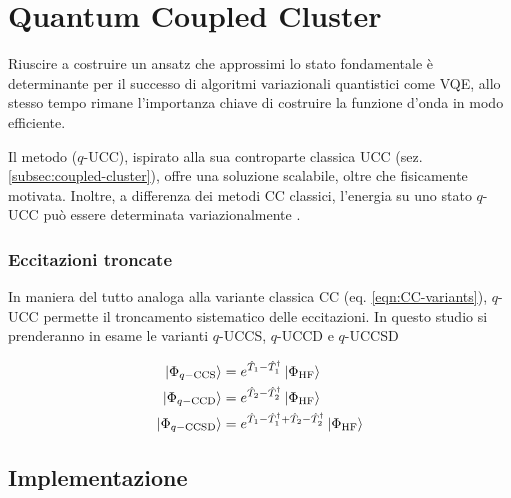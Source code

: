 \section{Quantum Coupled Cluster}\label{sez:quantum-coupled-cluster}
Riuscire a costruire un ansatz che approssimi lo stato fondamentale è determinante per il successo di algoritmi variazionali quantistici come VQE, allo stesso tempo rimane l'importanza chiave di costruire la funzione d'onda in modo efficiente.

Il metodo  ($q$-UCC), ispirato alla sua controparte classica UCC (sez. \ref{subsec:coupled-cluster}), offre una soluzione scalabile, oltre che fisicamente motivata. 
Inoltre, a differenza dei metodi CC classici, l'energia su uno stato $q$-UCC può essere determinata variazionalmente \cite{Anand_2022}.

\subsubsection{Eccitazioni troncate}

In maniera del tutto analoga alla variante classica CC (eq. \ref{eqn:CC-variants}), $q$-UCC permette il troncamento sistematico delle eccitazioni. In questo studio si prenderanno in esame le varianti $q$-UCCS, $q$-UCCD e $q$-UCCSD

\begin{subequations}\label{eqn:q-UCC-variants}
\begin{align}
    \ket{\Phi_{q-\text{CCS}}}  &= e^{\hat{T}_1-\hat{T}_{1}^{\dagger}} \ket{\Phi_{\text{HF}}}
    \\
    \ket{\Phi_{q-\text{CCD}}}  &= e^{\hat{T}_2-\hat{T}_{2}^{\dagger}} \ket{\Phi_{\text{HF}}}
    \\
    \ket{\Phi_{q-\text{CCSD}}} &= e^{\hat{T}_1-\hat{T}_{1}^{\dagger} + \hat{T}_2-\hat{T}_{2}^{\dagger}} \ket{\Phi_{\text{HF}}}
\end{align}
\end{subequations}



\subsection{Implementazione}

